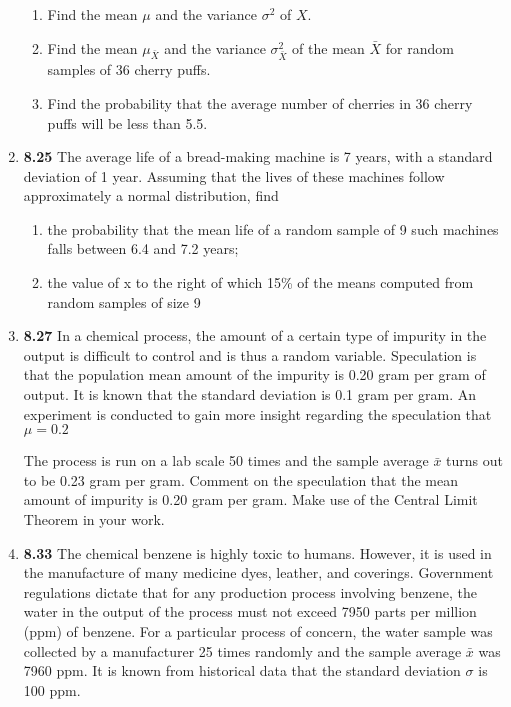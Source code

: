 \documentclass[basic, header]{nosvagor-notes}
\begin{document}
\begin{enumerate}[itemsep=4em]
\begin{enumerate}
      \item Find the mean \(\mu\) and the variance \(\sigma^2\) of \(X\).
      \item Find the mean \(\mu_{\bar{X}} \) and the variance
        \(\sigma^2_{\bar{X}} \) of the mean \(\bar{X}\) for random samples of
        36 cherry puffs.
      \item Find the probability that the average number of cherries in 36
        cherry puffs will be less than 5.5.

    \end{enumerate}

  \item \textbf{8.25} The average life of a bread-making machine is 7 years,
    with a standard deviation of 1 year. Assuming that the lives of these
    machines follow approximately a normal distribution, find
    \begin{enumerate}

      \item the probability that the mean life of a random sample of 9 such
        machines falls between 6.4 and 7.2 years;

      \item the value of x to the right of which 15\% of the means computed
        from random samples of size 9

    \end{enumerate}

  \newpage %

    \item \textbf{8.27} In a chemical process, the amount of a certain type of
      impurity in the output is difficult to control and is thus a random
      variable. Speculation is that the population mean amount of the impurity
      is 0.20 gram per gram of output. It is known that the standard deviation
      is 0.1 gram per gram. An experiment is conducted to gain more insight
      regarding the speculation that \(\mu = 0.2\)

      The process is run on a lab scale 50 times and the sample average \(\bar{x}\)
      turns out to be 0.23 gram per gram. Comment on the speculation that the
      mean amount of impurity is 0.20 gram per gram. Make use of the Central
      Limit Theorem in your work.

    \item \textbf{8.33} The chemical benzene is highly toxic to humans. However, it is
    used in the manufacture of many medicine dyes, leather, and coverings.
    Government regulations dictate that for any production process involving
    benzene, the water in the output of the process must not exceed 7950 parts
    per million (ppm) of benzene. For a particular process of concern, the
    water sample was collected by a manufacturer 25 times randomly and the
    sample average \(\bar{x}\) was 7960 ppm. It is known from historical data that the
    standard deviation \(\sigma\) is 100 ppm.
    \begin{enumerate}


\end{enumerate}
\end{enumerate}
\end{document}

